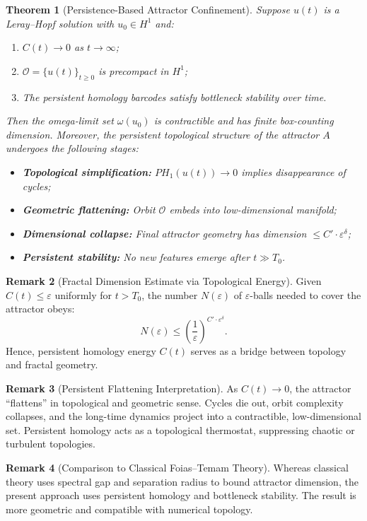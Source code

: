 \documentclass[11pt]{article}
\newtheorem{theorem}{Theorem}[section]
\theoremstyle{definition}
\newtheorem{remark}[theorem]{Remark}
\begin{document}
\begin{theorem}[Persistence-Based Attractor Confinement]
\label{thm:attractor-confinement}
Suppose $u(t)$ is a Leray–Hopf solution with $u_0 \in H^1$ and:
\begin{enumerate}
    \item $C(t) \to 0$ as $t \to \infty$;
    \item $\mathcal{O} = \{ u(t) \}_{t \ge 0}$ is precompact in $H^1$;
    \item The persistent homology barcodes satisfy bottleneck stability over time.
\end{enumerate}
Then the omega-limit set $\omega(u_0)$ is contractible and has finite box-counting dimension. Moreover, the persistent topological structure of the attractor $A$ undergoes the following stages:
\begin{itemize}
    \item \textbf{Topological simplification:} $PH_1(u(t)) \to 0$ implies disappearance of cycles;
    \item \textbf{Geometric flattening:} Orbit $\mathcal{O}$ embeds into low-dimensional manifold;
    \item \textbf{Dimensional collapse:} Final attractor geometry has dimension $\le C' \cdot \varepsilon^{\delta}$;
    \item \textbf{Persistent stability:} No new features emerge after $t \gg T_0$.
\end{itemize}
\end{theorem}

\begin{remark}[Fractal Dimension Estimate via Topological Energy]
Given $C(t) \le \varepsilon$ uniformly for $t > T_0$, the number $N(\varepsilon)$ of $\varepsilon$-balls needed to cover the attractor obeys:
\[
N(\varepsilon) \le \left(\frac{1}{\varepsilon}\right)^{C' \cdot \varepsilon^\delta}.
\]
Hence, persistent homology energy $C(t)$ serves as a bridge between topology and fractal geometry.
\end{remark}

\begin{remark}[Persistent Flattening Interpretation]
As $C(t) \to 0$, the attractor “flattens” in topological and geometric sense. Cycles die out, orbit complexity collapses, and the long-time dynamics project into a contractible, low-dimensional set. Persistent homology acts as a topological thermostat, suppressing chaotic or turbulent topologies.
\end{remark}

\begin{remark}[Comparison to Classical Foias–Temam Theory]
Whereas classical theory uses spectral gap and separation radius to bound attractor dimension, the present approach uses persistent homology and bottleneck stability. The result is more geometric and compatible with numerical topology.
\end{remark}
\end{document}
